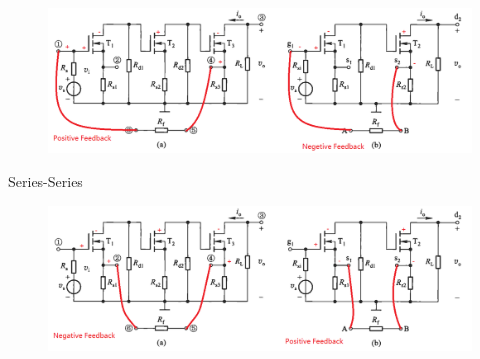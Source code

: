 \documentclass{article}
\begin{document}
\begin{figure}[H]
  \centering
  \includegraphics[width=\linewidth]{figures/Problem8183}
\end{figure}

Series-Series

\begin{figure}[H]
  \centering
  \includegraphics[width=\linewidth]{figures/Problem8184}
\end{figure}
\end{document}
